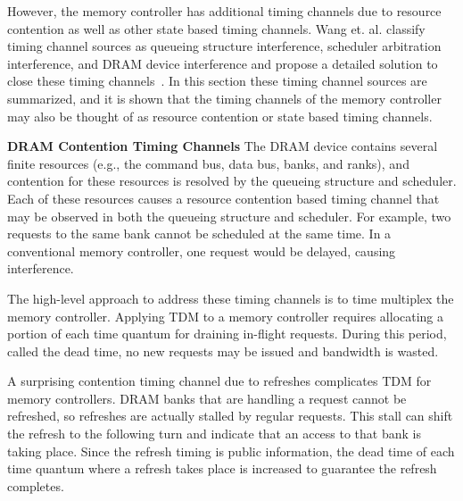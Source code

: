 However, the memory controller has additional timing channels due to resource 
contention as well as other state based timing channels. Wang et. al. classify 
timing channel sources as queueing structure interference, scheduler 
arbitration interference, and DRAM device interference and propose a detailed 
solution to close these timing channels~\cite{ushpca14}.  In this section these 
timing channel sources are summarized, and it is shown that the timing channels 
of the memory controller may also be thought of as resource contention or state 
based timing channels.

\textbf{DRAM Contention Timing Channels}
The DRAM device contains several finite resources (e.g., the command bus, data
bus, banks, and ranks), and contention for these resources is resolved by the 
queueing structure and scheduler. Each of these resources causes a resource 
contention based timing channel that may be observed in both the queueing 
structure and scheduler. For example, two requests to the same bank cannot
be scheduled at the same time. In a conventional memory controller, one request 
would be delayed, causing interference.

The high-level approach to address these timing channels is to time multiplex 
the memory controller. Applying TDM to a memory controller requires allocating 
a portion of each time quantum for draining in-flight requests. During this 
period, called the dead time, no new requests may be issued and bandwidth is 
wasted. 

A surprising contention timing channel due to refreshes complicates TDM for 
memory controllers. DRAM banks that are handling a request cannot be refreshed, 
so refreshes are actually stalled by regular requests. This stall can shift the 
refresh to the following turn and indicate that an access to that bank is 
taking place. Since the refresh timing is public information, the dead time of 
each time quantum where a refresh takes place is increased to guarantee the 
refresh completes.

